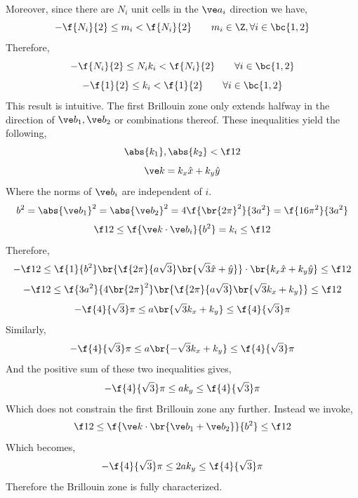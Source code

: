 \documentclass{article}
\begin{document}
Moreover, since there are $N_i$ unit cells in the $\ve a_i$ direction we have,
\[ - \f{N_i}{2} \leq m_i < \f{N_i}{2} \qquad m_i \in \Z, \forall i \in \bc{1,2} \]
Therefore,
\[ - \f{N_i}{2} \leq N_i k_i < \f{N_i}{2} \qquad \forall i \in \bc{1,2} \]
\[ - \f{1}{2} \leq k_i < \f{1}{2} \qquad \forall i \in \bc{1,2} \]
This result is intuitive. The first Brillouin zone only extends halfway in the direction of $\ve b_1, \ve b_2$ or combinations thereof. These inequalities yield the following,
\[ \abs{k_1}, \abs{k_2} < \f12  \]
\[ \ve k = k_x \hat x + k_y \hat y  \]
Where the norms of $\ve b_i$ are independent of $i$.
\[ b^2 = \abs{\ve b_1}^2 = \abs{\ve b_2}^2 =  4\f{\br{2 \pi}^2}{3a^2} = \f{16 \pi^2}{3a^2}\]
\[ \f12 \leq \f{\ve k \cdot \ve b_i}{b^2} = k_i \leq \f12  \]
Therefore,
\[ -\f12 \leq \f{1}{b^2} \br{\f{2 \pi}{a\sqrt{3}} \br{\sqrt{3} \hat x +  \hat y}} \cdot \br{k_x \hat x + k_y \hat y} \leq \f12  \]
\[ -\f12 \leq \f{3a^2}{4\br{2 \pi}^2} \br{\f{2 \pi}{a\sqrt{3}} \br{\sqrt{3} k_x +  k_y}} \leq \f12  \]
\[ -\f{4}{\sqrt{3}}\pi \leq  a\br{\sqrt{3} k_x +  k_y} \leq \f{4}{\sqrt{3}}\pi  \]
Similarly,
\[ -\f{4}{\sqrt{3}}\pi \leq  a\br{-\sqrt{3} k_x +  k_y} \leq \f{4}{\sqrt{3}}\pi  \]
And the positive sum of these two inequalities gives,
\[ -\f{4}{\sqrt{3}}\pi \leq  ak_y \leq \f{4}{\sqrt{3}}\pi  \]
Which does not constrain the first Brillouin zone any further. Instead we invoke,
\[ \f12 \leq \f{\ve k \cdot \br{\ve b_1 + \ve b_2}}{b^2} \leq \f12  \]
Which becomes,
\[ -\f{4}{\sqrt{3}}\pi \leq 2ak_y \leq \f{4}{\sqrt{3}}\pi  \]
Therefore the Brillouin zone is fully characterized.
\begin{center}
\end{center}
\end{document}
